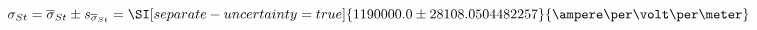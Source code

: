 
\begin{equation}
    \sigma_{St}
        = \overline{\sigma}_{St} \pm s_{\overline{\sigma}_{St}}
        = \SI[separate-uncertainty = true]{1190000.0 \pm 28108.0504482257 }{\ampere\per\volt\per\meter}
\end{equation}